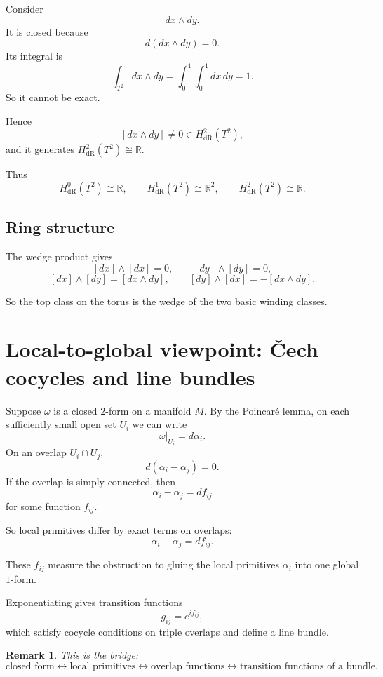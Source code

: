 \documentclass[11pt]{article}
\newtheorem{remark}{Remark}
\begin{document}
	Consider
	\[
	dx\wedge dy.
	\]
	It is closed because
	\[
	d(dx\wedge dy)=0.
	\]
	Its integral is
	\[
	\int_{T^2}dx\wedge dy=\int_0^1\int_0^1 dx\,dy=1.
	\]
	So it cannot be exact.
	
	Hence
	\[
	[dx\wedge dy]\neq 0 \in H^2_{\mathrm{dR}}(T^2),
	\]
	and it generates \(H^2_{\mathrm{dR}}(T^2)\cong \mathbb{R}\).
	
	Thus
	\[
	H^0_{\mathrm{dR}}(T^2)\cong \mathbb{R},
	\qquad
	H^1_{\mathrm{dR}}(T^2)\cong \mathbb{R}^2,
	\qquad
	H^2_{\mathrm{dR}}(T^2)\cong \mathbb{R}.
	\]
	
	\subsection{Ring structure}
	
	The wedge product gives
	\[
	[dx]\wedge[dx]=0,\qquad [dy]\wedge[dy]=0,
	\]
	\[
	[dx]\wedge[dy]=[dx\wedge dy],
	\qquad
	[dy]\wedge[dx]=-[dx\wedge dy].
	\]
	
	So the top class on the torus is the wedge of the two basic winding classes.
	
	\section{Local-to-global viewpoint: \v{C}ech cocycles and line bundles}
	
	Suppose \(\omega\) is a closed \(2\)-form on a manifold \(M\). By the Poincar\'e lemma, on each sufficiently small open set \(U_i\) we can write
	\[
	\omega|_{U_i}=d\alpha_i.
	\]
	On an overlap \(U_i\cap U_j\),
	\[
	d(\alpha_i-\alpha_j)=0.
	\]
	If the overlap is simply connected, then
	\[
	\alpha_i-\alpha_j=df_{ij}
	\]
	for some function \(f_{ij}\).
	
	So local primitives differ by exact terms on overlaps:
	\[
	\alpha_i-\alpha_j=df_{ij}.
	\]
	
	These \(f_{ij}\) measure the obstruction to gluing the local primitives \(\alpha_i\) into one global \(1\)-form.
	
	Exponentiating gives transition functions
	\[
	g_{ij}=e^{if_{ij}},
	\]
	which satisfy cocycle conditions on triple overlaps and define a line bundle.
	
	\begin{remark}
		This is the bridge:
		\[
		\text{closed form}
		\longleftrightarrow
		\text{local primitives}
		\longleftrightarrow
		\text{overlap functions}
		\longleftrightarrow
		\text{transition functions of a bundle.}
		\]
	\end{remark}
	
\end{document}
